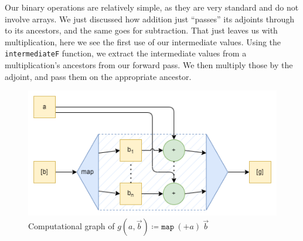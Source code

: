         Our binary operations are relatively simple, as they are very standard and do not involve arrays.
        We just discussed how addition just ``passes'' its adjoints through to its ancestors, and the same goes for subtraction.
        That just leaves us with multiplication, here we see the first use of our intermediate values.
        Using the \texttt{intermediateF} function, we extract the intermediate values from a multiplication's ancestors from our forward pass.
        We then multiply those by the adjoint, and pass them on the appropriate ancestor.

        \begin{figure}[htb]
            \centering
            \includegraphics[scale=0.5]{diagrams/map_example.png}
            \caption{Computational graph of $g(a,\vec{b})\coloneqq\texttt{map}\ (+a)\ \vec{b}$}
            \label{fig:map_graph}
        \end{figure}

